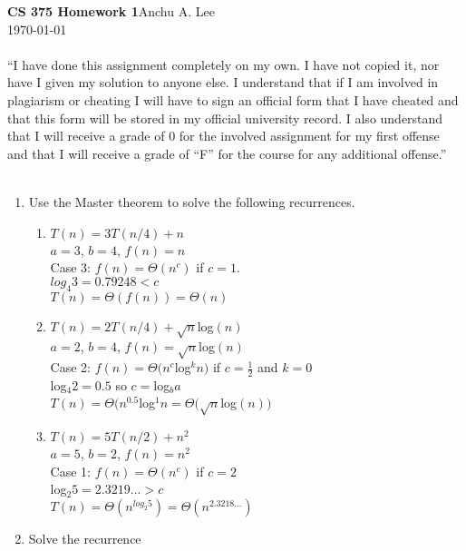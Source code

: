 \documentclass{article}
\begin{document}
    \noindent\textbf{CS 375 Homework 1}\hfill Anchu A. Lee\\
    \noindent\today
    \\\\“I have done this assignment completely on my own. I have not copied it, nor have I given my solution to anyone else. I understand that if I am involved in plagiarism or cheating I will have to sign an official form that I have cheated and that this form will be stored in my official university record. I also understand that I will receive a grade of 0 for the involved assignment for my first offense and that I will receive a grade of “F” for the course for any additional offense.” 
    \\\\
    \begin{enumerate}
        \item Use the Master theorem to solve the following recurrences.
            \begin{enumerate}
                \item $T(n)=3T(n/4)+n$\\
                    $a = 3$, $b = 4$, $f(n) = n$\\
                    Case 3: $f(n) = \Theta(n^c)$ if $c=1$. \\
                    $log_{4}3 = 0.79248 < c$\\
                    $T(n) = \Theta(f(n)) = \Theta(n)$
                \item $T(n)=2T(n/4)+\sqrt{n}$log$(n)$\\
                    $a = 2$, $b = 4$, $f(n) = \sqrt{n}$log$(n)$\\
                    Case 2: $f(n)=\Theta(n^c$log$^kn)$ if $c= \frac{1}{2}$ and $k=0$\\
                    log$_{4}2 = 0.5$ so $c =$log$_ba$\\
                    $T(n)=\Theta(n^{0.5}$log$^1n = \Theta(\sqrt{n}$log$(n))$
                \item $T(n)=5T(n/2)+n^2$\\
                    $a = 5$, $b = 2$, $f(n) = n^2$\\
                    Case 1: $f(n) = \Theta(n^c)$ if $c = 2$\\
                    log$_{2}5=2.3219... > c$\\
                    $T(n) = \Theta(n^{log_{2}5}) = \Theta(n^{2.3218...})$
            \end{enumerate}
        \item Solve the recurrence 

\end{enumerate}
\end{document}
